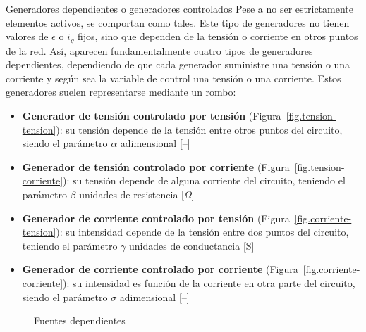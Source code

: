 \documentclass[11pt]{book} %
\makeatletter
\numberwithin{dummy}{section}
\theoremstyle{ocrenumbox}
\theoremstyle{blacknumex}
\theoremstyle{blacknumbox}
\theoremstyle{ocrenum}
\renewcommand{\subsubsection}{\@startsection {subsubsection}{3}{\z@}
{-2ex \@plus -0.1ex \@minus -.2ex}
{.2ex \@plus.2ex }
{\normalfont\small\sffamily\bfseries}}
\makeatother
\begin{document}
	\subsubsection{Generadores dependientes o generadores controlados}
	Pese a no ser estrictamente elementos activos, se comportan como tales. Este tipo de generadores no tienen valores de $\epsilon$ o $i_g$ fijos, sino que dependen de la tensión o corriente en otros puntos de la red. Así, aparecen fundamentalmente cuatro tipos de generadores dependientes, dependiendo de que cada generador suministre una tensión o una corriente y según sea la variable de control una tensión o una corriente. Estos generadores suelen representarse mediante un rombo:
	\begin{itemize}
		\item \textbf{Generador de tensión controlado por tensión} (Figura~\ref{fig.tension-tension}): su tensión depende de la tensión entre otros puntos del circuito, siendo el parámetro $\alpha$ adimensional [--]
		\item \textbf{Generador de tensión controlado por corriente} (Figura~\ref{fig.tension-corriente}): su tensión depende de alguna corriente del circuito, teniendo el parámetro $\beta$ unidades de resistencia [$\Omega$]
		\item \textbf{Generador de corriente controlado por tensión} (Figura~\ref{fig.corriente-tension}): su intensidad depende de la tensión entre dos puntos del circuito, teniendo el parámetro $\gamma$ unidades de conductancia [S]
		\item \textbf{Generador de corriente controlado por corriente} (Figura~\ref{fig.corriente-corriente}): su intensidad es función de la corriente en otra parte del circuito, siendo el parámetro $\sigma$ adimensional [--]
	\end{itemize}
	\begin{figure}[htbp]
		\centering
		\hfill
		\hfill
		\hfill
		\caption{Fuentes dependientes}
		\label{fig.fuentes_dependientes}
	\end{figure}
	
\end{document}
